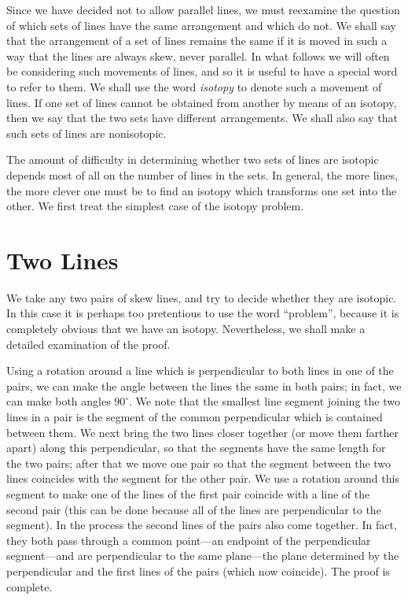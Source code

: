 \documentclass{article}
\begin{document}
Since we have decided not to allow parallel lines, we must reexamine the
question of which sets of lines have the same arrangement and which do not. We
shall say that the arrangement of a set of lines remains the same if it is
moved in such a way that the lines are always skew, never parallel. In what
follows we will often be considering such movements of lines, and so it is
useful to have a special word to refer to them. We shall use the word {\em
isotopy\/} to denote such a movement of lines. If one set of lines cannot be
obtained from another by means of an isotopy, then we say that the two sets
have different arrangements. We shall also say that such sets of lines are
nonisotopic.


The amount of difficulty in determining whether two sets of lines are isotopic
depends most of all on the number of lines in the sets. In general, the more
lines, the more clever one must be to find an isotopy which transforms one set
into the other. We first treat the simplest case of the isotopy problem.
 
\section{ Two Lines}
We take any two pairs of skew lines, and try to decide whether they are
isotopic. In this case it is perhaps too pretentious to use the word
``problem'', because it is completely obvious that we have an isotopy.
Nevertheless, we shall make a detailed examination of the proof.


Using a rotation around a line which is perpendicular to both lines in one of
the pairs, we can make the angle between the lines the same in both pairs; in
fact, we can make both angles $90^\circ$. We note that the smallest line
segment joining the two lines in a pair is the segment of the common
perpendicular which is contained between them. We next bring the two lines
closer together (or move them farther apart) along this perpendicular, so that
the segments have the same length for the two pairs; after that we move one
pair so that the segment between the two lines coincides with the segment for
the other pair.
 We use a rotation around this segment to make one of the lines of the first
pair coincide with a line of the second pair (this can be done because all of
the lines are perpendicular to the segment). In the process the second lines of
the pairs also come together. In fact, they both pass through a common
point---an endpoint of the perpendicular segment---and are perpendicular to the
same plane---the plane determined by the perpendicular and the first lines of
the pairs (which now coincide). The proof is complete.
\end{document}
